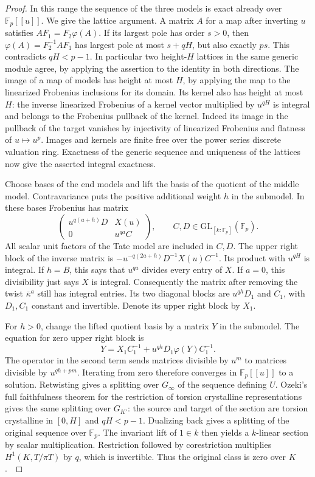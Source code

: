 \documentclass[a4paper,11pt]{article}
\theoremstyle{definition}
\theoremstyle{remark}
\numberwithin{equation}{section}
\begin{document}
\begin{proof}
In this range the sequence of the three models is exact already
over \(\mathbb F_p[[u]]\). We give the lattice argument. A matrix
\(A\) for a map after inverting \(u\) satisfies
\(AF_1=F_2\varphi(A)\). If its largest pole has order \(s>0\),
then \(\varphi(A)=F_2^{-1}AF_1\) has largest pole at most \(s+qH\),
but also exactly \(ps\). This contradicts \(qH<p-1\). In particular
two height-\(H\) lattices in the same generic module agree, by applying
the assertion to the identity in both directions. The image of a
map of models has height at most \(H\), by applying the map to the
linearized Frobenius inclusions for its domain. Its kernel also
has height at most \(H\): the inverse linearized Frobenius of a
kernel vector multiplied by \(u^{qH}\) is integral and belongs to
the Frobenius pullback of the kernel. Indeed its image in the
pullback of the target vanishes by injectivity of linearized
Frobenius and flatness of \(u\mapsto u^p\). Images and kernels
are finite free over the power series discrete valuation ring.
Exactness of the generic sequence and uniqueness of the lattices
now give the asserted integral exactness.

Choose bases of the end models and lift the basis of the quotient
of the middle model. Contravariance puts the positive additional
weight \(h\) in the submodel. In these bases Frobenius has matrix
\[
    \begin{pmatrix}
       u^{q(a+h)}D & X(u)\\
          0        & u^{qa}C
    \end{pmatrix},
    \qquad C,D\in\mathrm{GL}_{[k:\mathbb F_p]}(\mathbb F_p).
 \tag{11}\label{eq:tameends743}
\]
All scalar unit factors of the Tate model are included in \(C,D\).
The upper right block of the inverse matrix is
\(-u^{-q(2a+h)}D^{-1}X(u)C^{-1}\). Its product with \(u^{qH}\)
is integral. If \(h=B\), this says that \(u^{qa}\) divides every
entry of \(X\). If \(a=0\), this divisibility just says \(X\)
is integral. Consequently the matrix after removing the twist
\(\bar\kappa^a\) still has integral entries. Its two diagonal
blocks are \(u^{qh}D_1\) and \(C_1\), with \(D_1,C_1\) constant
and invertible. Denote its upper right block by \(X_1\).

For \(h>0\), change the lifted quotient basis by a matrix \(Y\)
in the submodel. The equation for zero upper right block is
\[
       Y=X_1 C_1^{-1}+u^{qh}D_1\varphi(Y)C_1^{-1}.
\]
The operator in the second term sends matrices divisible by \(u^m\)
to matrices divisible by \(u^{qh+pm}\). Iterating from zero therefore
converges in \(\mathbb F_p[[u]]\) to a solution. Retwisting gives
a splitting over \(G_\infty\) of the sequence defining \(U\).
Ozeki's full faithfulness theorem for the restriction of torsion
crystalline representations gives the same splitting over \(G_{K'}\):
the source and target of the section are torsion crystalline in
\([0,H]\) and \(qH<p-1\). Dualizing back gives a splitting of the
original sequence over \(\mathbb F_p\). The invariant lift of
\(1\in k\) then yields a \(k\)-linear section by scalar
multiplication. Restriction followed by corestriction multiplies
\(H^1(K,T/\pi T)\) by \(q\), which is invertible. Thus the
original class is zero over \(K\).~\cite[Theorem~1]{III-II-ozekitame743}


\end{proof}
\end{document}
